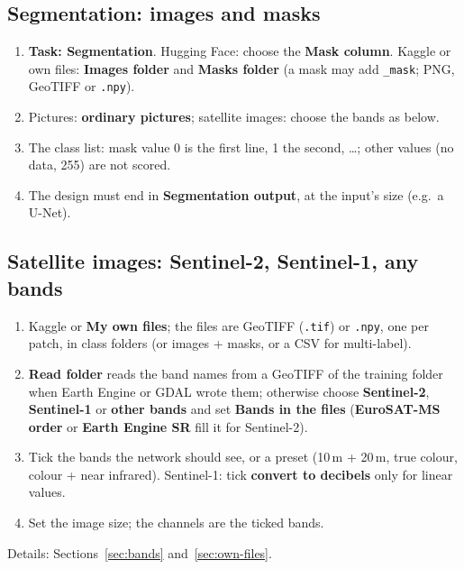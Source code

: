 \documentclass[11pt,a4paper]{article}
\newcommand{\ui}[1]{\textbf{\textsf{#1}}}
\newcommand{\file}[1]{\texttt{#1}}
\begin{document}
\subsection{Segmentation: images and masks}
\begin{enumerate}[nosep]
  \item \ui{Task: Segmentation}. Hugging Face: choose the \ui{Mask column}. Kaggle or own files: \ui{Images folder} and \ui{Masks folder}
        (a mask may add \file{\_mask}; PNG, GeoTIFF or \file{.npy}).
  \item Pictures: \ui{ordinary pictures}; satellite images: choose the bands as below.
  \item The class list: mask value 0 is the first line, 1 the second, \dots; other values (no data, 255) are not scored.
  \item The design must end in \ui{Segmentation output}, at the input's size (e.g.\ a U-Net).
\end{enumerate}

\subsection{Satellite images: Sentinel-2, Sentinel-1, any bands}
\begin{enumerate}[nosep]
  \item Kaggle or \ui{My own files}; the files are GeoTIFF (\file{.tif}) or \file{.npy}, one per patch, in class folders (or images +
        masks, or a CSV for multi-label).
  \item \ui{Read folder} reads the band names from a GeoTIFF of the training folder when Earth Engine or GDAL wrote them; otherwise choose
        \ui{Sentinel-2}, \ui{Sentinel-1} or \ui{other bands} and set \ui{Bands in the files} (\ui{EuroSAT-MS order} or \ui{Earth Engine
        SR} fill it for Sentinel-2).
  \item Tick the bands the network should see, or a preset (10\,m + 20\,m, true colour, colour + near infrared). Sentinel-1: tick
        \ui{convert to decibels} only for linear values.
  \item Set the image size; the channels are the ticked bands.
\end{enumerate}
Details: Sections~\ref{sec:bands} and~\ref{sec:own-files}.
\end{document}
